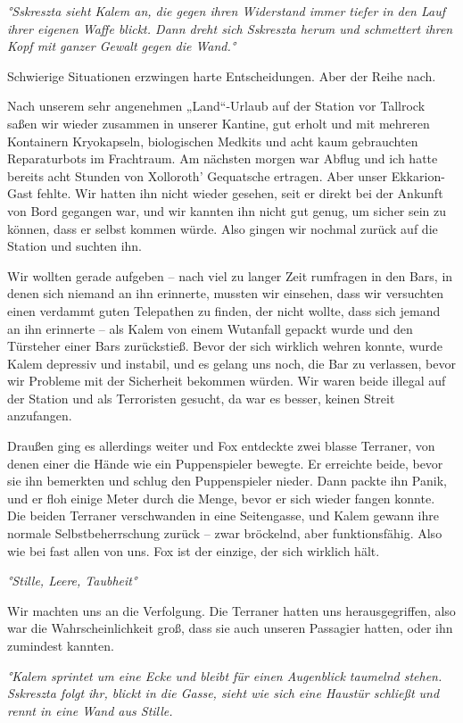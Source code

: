 \documentclass[11pt]{scrartcl}
\begin{document}
\emph{°Sskreszta sieht Kalem an, die gegen ihren Widerstand immer tiefer
in den Lauf ihrer eigenen Waffe blickt. Dann dreht sich Sskreszta herum
und schmettert ihren Kopf mit ganzer Gewalt gegen die Wand.°}

Schwierige Situationen erzwingen harte Entscheidungen. Aber der Reihe
nach.

Nach unserem sehr angenehmen „Land``-Urlaub auf der Station vor Tallrock
saßen wir wieder zusammen in unserer Kantine, gut erholt und mit
mehreren Kontainern Kryokapseln, biologischen Medkits und acht kaum
gebrauchten Reparaturbots im Frachtraum. Am nächsten morgen war Abflug
und ich hatte bereits acht Stunden von Xolloroth' Gequatsche ertragen.
Aber unser Ekkarion-Gast fehlte. Wir hatten ihn nicht wieder gesehen,
seit er direkt bei der Ankunft von Bord gegangen war, und wir kannten
ihn nicht gut genug, um sicher sein zu können, dass er selbst kommen
würde. Also gingen wir nochmal zurück auf die Station und suchten ihn.

Wir wollten gerade aufgeben -- nach viel zu langer Zeit rumfragen in den
Bars, in denen sich niemand an ihn erinnerte, mussten wir einsehen, dass
wir versuchten einen verdammt guten Telepathen zu finden, der nicht
wollte, dass sich jemand an ihn erinnerte -- als Kalem von einem
Wutanfall gepackt wurde und den Türsteher einer Bars zurückstieß. Bevor
der sich wirklich wehren konnte, wurde Kalem depressiv und instabil, und
es gelang uns noch, die Bar zu verlassen, bevor wir Probleme mit der
Sicherheit bekommen würden. Wir waren beide illegal auf der Station und
als Terroristen gesucht, da war es besser, keinen Streit anzufangen.

Draußen ging es allerdings weiter und Fox entdeckte zwei blasse
Terraner, von denen einer die Hände wie ein Puppenspieler bewegte. Er
erreichte beide, bevor sie ihn bemerkten und schlug den Puppenspieler
nieder. Dann packte ihn Panik, und er floh einige Meter durch die Menge,
bevor er sich wieder fangen konnte. Die beiden Terraner verschwanden in
eine Seitengasse, und Kalem gewann ihre normale Selbstbeherrschung
zurück -- zwar bröckelnd, aber funktionsfähig. Also wie bei fast allen
von uns. Fox ist der einzige, der sich wirklich hält.

\emph{°Stille, Leere, Taubheit°}

Wir machten uns an die Verfolgung. Die Terraner hatten uns
herausgegriffen, also war die Wahrscheinlichkeit groß, dass sie auch
unseren Passagier hatten, oder ihn zumindest kannten.

\emph{°Kalem sprintet um eine Ecke und bleibt für einen Augenblick
taumelnd stehen. Sskreszta folgt ihr, blickt in die Gasse, sieht wie
sich eine Haustür schließt und rennt in eine Wand aus Stille.}
\end{document}
